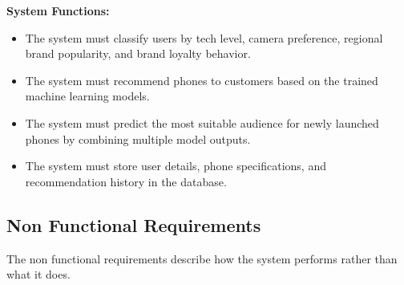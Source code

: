 \documentclass[12pt, a4paper]{report}
\numberwithin{equation}{chapter}
\begin{document}
\textbf{System Functions:}

\begin{itemize}

\item The system must classify users by tech level, camera preference, regional brand popularity, and brand loyalty behavior.

\item The system must recommend phones to customers based on the trained machine learning models.

\item The system must predict the most suitable audience for newly launched phones by combining multiple model outputs.

\item The system must store user details, phone specifications, and recommendation history in the database.

\end{itemize}

\subsection{Non Functional Requirements}

The non functional requirements describe how the system performs rather than what it does.
\end{document}
